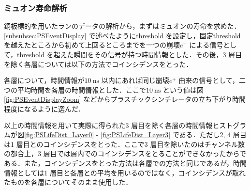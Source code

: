 \subsubsection{ミュオン寿命解析}
\label{subsubsec:PSLife}
銅板標的を用いたランのデータの解析から，まずはミュオンの寿命を求めた．\ref{subsubsec:PSEventDisplay} で述べたようにthreshold を設定し，固定threshold を越えたところから初めて上回るところまでを一つの崩壊$e^{+}$ による信号として，threshold を超えた瞬間をその信号が持つ時間情報とした．その後，3 層目を除く各層については以下の方法でコインシデンスをとった．

各層について，時間情報が$10~\mathrm{ns}$ 以内にあれば同じ崩壊$e^{+}$ 由来の信号として，二つの平均時間を各層の時間情報とした．ここで$10~\mathrm{ns}$ という値は図\ref{fig:PSEventDisplayZoom} などからプラスチックシンチレータの立ち下がり時間程度になるように選んだ．

以上の時間情報を用いて実際に得られた3 層目を除く各層の時間情報ヒストグラムが図\ref{fig:PSLifeDist_Layer0} - \ref{fig:PSLifeDist_Layer3} である．ただし2, 4 層目は1 層目とのコインシデンスをとった．ここで3 層目を除いたのはチャンネル数の都合上，3 層目では層内でのコインシデンスをとることができなかったからである．また，コインシデンスをとった方法は各層での方法と同じであるが，時間情報としては1 層目と各層との平均を用いるのではなく，コインシデンスが取れたものを各層についてそのまま使用した．

